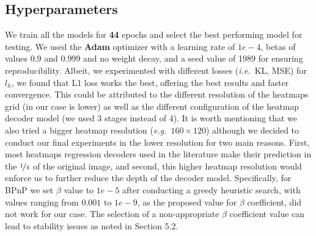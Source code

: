 \subsection{Hyperparameters}
We train all the models for \textbf{44} epochs and select the best performing model for testing. 
We used the \textbf{Adam} optimizer with a learning rate of $1e-4$, betas of values $0.9$ and $0.999$ and no weight decay, and a seed value of 1989 for ensuring reproducibility.
Albeit, we experimented with different losses (\textit{i.e.}~KL, MSE) for $l_h$, we found that L1 loss works the best, offering the best results and faster convergence. 
This could be attributed to the different resolution of the heatmaps grid (in our case is lower) as well as the different configuration of the heatmap decoder model (we used 3 stages instead of 4). 
It is worth mentioning that we also tried a bigger heatmap resolution (\textit{e.g.}~$160 \times 120$) although we decided to conduct our final experiments in the lower resolution for two main reasons. 
First, most heatmaps regression decoders used in the literature make their prediction in the $\nicefrac{1}{4}$ of the original image, and second, this higher heatmap resolution would enforce us to further reduce the depth of the decoder model.
Specifically, for BPnP we set $\beta$ value to $1e-5$ after conducting a greedy heuristic search, with values ranging from $0.001$ to $1e-9$, as the proposed value for $\beta$ coefficient, did not work for our case. The selection of a non-appropriate $\beta$ coefficient value can lead to stability issues as noted in Section 5.2. 


